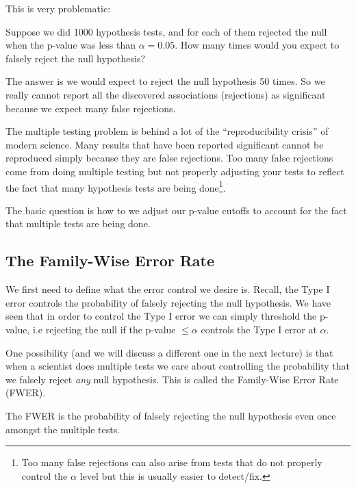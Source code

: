 \documentclass[twoside,12pt]{article}
\begin{document}
This is very problematic: 

Suppose we did 1000 hypothesis tests, and for each of them rejected
the null when the p-value was less than $\alpha = 0.05$. How many times would you expect to falsely
reject the null hypothesis? 

The answer is we would expect to reject the null hypothesis 50 times. So we really cannot report all the discovered associations (rejections) as significant because we expect many false rejections.

The multiple testing problem is behind a lot of the ``reproducibility crisis'' of modern science. Many results that have been reported significant cannot be reproduced simply because they are false rejections. Too many false rejections come from doing multiple testing but not properly adjusting your tests to reflect the fact that many hypothesis tests are being done\footnote{Too many false rejections can also arise from tests that do not properly control the $\alpha$ level but this is usually easier to detect/fix.}.

The basic question is how to we adjust our p-value cutoffs to account for the fact that multiple tests are being done.

\subsection{The Family-Wise Error Rate}
We first need to define what the error control we desire is. Recall, the Type I error controls the probability of falsely rejecting the null hypothesis. We have seen that in order to control the Type I error
we can simply threshold the p-value, i.e rejecting the null if the p-value $\leq \alpha$ controls the Type I error at $\alpha$. 


One possibility (and we will discuss a different one in the next lecture) is that when a scientist does multiple tests we care about controlling the probability that we falsely reject \emph{any} null hypothesis. This is called the Family-Wise Error Rate (FWER).

The FWER is the probability of falsely rejecting the null hypothesis even once amongst the multiple tests. 
\end{document}
